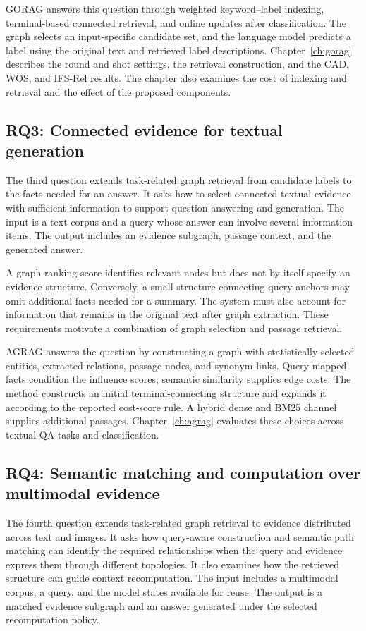 GORAG answers this question through weighted keyword--label indexing, terminal-based connected retrieval, and online updates after classification. The graph selects an input-specific candidate set, and the language model predicts a label using the original text and retrieved label descriptions. Chapter~\ref{ch:gorag} describes the round and shot settings, the retrieval construction, and the CAD, WOS, and IFS-Rel results. The chapter also examines the cost of indexing and retrieval and the effect of the proposed components.

\subsection{RQ3: Connected evidence for textual generation}
The third question extends task-related graph retrieval from candidate labels to the facts needed for an answer. It asks how to select connected textual evidence with sufficient information to support question answering and generation. The input is a text corpus and a query whose answer can involve several information items. The output includes an evidence subgraph, passage context, and the generated answer.

A graph-ranking score identifies relevant nodes but does not by itself specify an evidence structure. Conversely, a small structure connecting query anchors may omit additional facts needed for a summary. The system must also account for information that remains in the original text after graph extraction. These requirements motivate a combination of graph selection and passage retrieval.

AGRAG answers the question by constructing a graph with statistically selected entities, extracted relations, passage nodes, and synonym links. Query-mapped facts condition the influence scores; semantic similarity supplies edge costs. The method constructs an initial terminal-connecting structure and expands it according to the reported cost-score rule. A hybrid dense and BM25 channel supplies additional passages. Chapter~\ref{ch:agrag} evaluates these choices across textual QA tasks and classification.

\subsection{RQ4: Semantic matching and computation over multimodal evidence}
The fourth question extends task-related graph retrieval to evidence distributed across text and images. It asks how query-aware construction and semantic path matching can identify the required relationships when the query and evidence express them through different topologies. It also examines how the retrieved structure can guide context recomputation. The input includes a multimodal corpus, a query, and the model states available for reuse. The output is a matched evidence subgraph and an answer generated under the selected recomputation policy.

